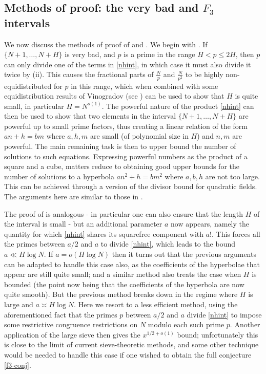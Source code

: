\documentclass[12pt]{amsart}
\begin{document}
\subsection{Methods of proof: the very bad and \texorpdfstring{$F_3$}{F3} intervals}

We now discuss the methods of proof of  and .  We begin with .  If $\{N+1,\dots,N+H\}$ is very bad, and $p$ is a prime in the range $H < p \leq 2H$, then $p$ can only divide one of the terms in \eqref{nhint}, in which case it must also divide it twice by (ii).  This causes the fractional parts of $\frac{N}{p}$ and $\frac{N}{p^2}$ to be highly non-equidistributed for $p$ in this range, which when combined with some equidistribution results of Vinogradov (see ) can be used to show that $H$ is quite small, in particular $H = N^{o(1)}$.  The powerful nature of the product \eqref{nhint} can then be used to show that two elements in the interval $\{N+1,\dots,N+H\}$ are powerful up to small prime factors, thus creating a linear relation of the form $an+h = bm$ where $a,h,m$ are small (of polynomial size in $H$) and $n,m$ are powerful.  The main remaining task is then to upper bound the number of solutions to such equations.  Expressing powerful numbers as the product of a square and a cube, matters reduce to obtaining good upper bounds for the number of solutions to a hyperbola $an^2 + h = bm^2$ where $a,b,h$ are not too large.  This can be achieved through a version of the divisor bound for quadratic fields. The arguments here are similar to those in \cite{aktas}.

The proof of  is analogous - in particular one can also ensure that the length $H$ of the interval is small - but an additional parameter $a$ now appears, namely the quantity for which \eqref{nhint} shares its squarefree component with $a!$.  This forces all the primes between $a/2$ and $a$ to divide \eqref{nhint}, which leads to the bound $a \ll H \log N$.  If $a = o(H \log N)$ then it turns out that the previous arguments can be adapted to handle this case also, as the coefficients of the hyperbolae that appear are still quite small; and a similar method also treats the case when $H$ is bounded (the point now being that the coefficients of the hyperbola are now quite smooth).  But the previous method breaks down in the regime where $H$ is large and $a \asymp H \log N$.  Here we resort to a less efficient method, using the aforementioned fact that the primes $p$ between $a/2$ and $a$ divide \eqref{nhint} to impose some restrictive congruence restrictions on $N$ modulo each such prime $p$.  Another application of the large sieve then gives the $x^{1/2+o(1)}$ bound; unfortunately this is close to the limit of current sieve-theoretic methods, and some other technique would be needed to handle this case if one wished to obtain the full conjecture \eqref{f3-conj}.
\end{document}
